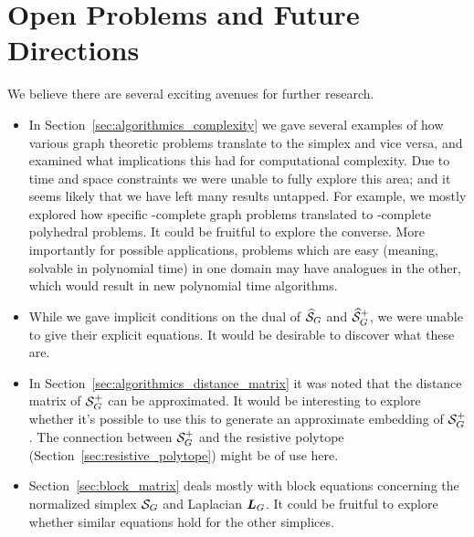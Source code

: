 \section{Open Problems and Future Directions}
\label{sec:open_problems}

We believe there are several exciting  avenues for further  research. 
\begin{itemize}
	\item In Section~\ref{sec:algorithmics_complexity} we gave several  examples of how various graph  theoretic problems translate to the simplex and vice  versa, and examined what implications this had for computational complexity. Due to time and space constraints we were unable to fully explore this area; and it seems likely that we have left many  results untapped.  For example, we mostly explored how specific \NP-complete graph problems translated to \NP-complete polyhedral problems. It could be fruitful to explore the converse. More importantly for possible applications, problems which are easy (meaning, solvable in polynomial time) in one domain may have analogues  in the other, which would result in new polynomial  time  algorithms. 
	\item While  we gave implicit conditions on the  dual of $\widehat{\mathcal{S}}_G$ and $\widehat{\mathcal{S}}_G^+$, we were unable to give their explicit equations. It  would be desirable to discover what these are.   
	\item In Section~\ref{sec:algorithmics_distance_matrix} it was noted that the distance matrix of $\mathcal{S}_G^+$ can be approximated. It would  be interesting to explore whether  it's possible to  use this to generate an  approximate embedding of $\mathcal{S}_G^+$. The connection between  $\mathcal{S}_G^+$  and the resistive polytope  (Section~\ref{sec:resistive_polytope}) might be of use here. 
	\item Section~\ref{sec:block_matrix} deals  mostly with block equations  concerning the normalized simplex $\mathcal{S}_G$ and  Laplacian $\vb*{L}_G$. It could be fruitful to explore whether similar  equations  hold for the other simplices. 
\end{itemize}

